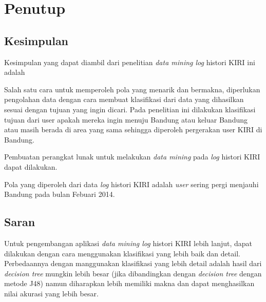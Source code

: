 \chapter{Penutup}

\section{Kesimpulan}

Kesimpulan yang dapat diambil dari penelitian \textsl{data mining log} histori KIRI ini adalah 

Salah satu cara untuk memperoleh pola yang menarik dan bermakna, diperlukan pengolahan data dengan cara membuat klasifikasi dari data yang dihasilkan sesuai dengan tujuan yang ingin dicari. Pada penelitian ini dilakukan klasifikasi tujuan dari user apakah mereka ingin menuju Bandung atau keluar Bandung atau masih berada di area yang sama sehingga diperoleh pergerakan user KIRI di Bandung.

Pembuatan perangkat lunak untuk melakukan \textsl{data mining} pada \textsl{log} histori KIRI dapat dilakukan.

Pola yang diperoleh dari data \textsl{log} histori KIRI adalah \textsl{user} sering pergi menjauhi Bandung pada bulan Febuari 2014.

\section{Saran}
Untuk pengembangan aplikasi \textsl{data mining log} histori KIRI lebih lanjut, dapat dilakukan dengan cara menggunakan klasifikasi yang lebih baik dan detail. Perbedaannya dengan manggunakan klasifikasi yang lebih detail adalah hasil dari \textsl{decision tree} mungkin lebih besar (jika dibandingkan dengan \textsl{decision tree} dengan metode J48) namun diharapkan lebih memiliki makna dan dapat menghasilkan nilai akurasi yang lebih besar.

